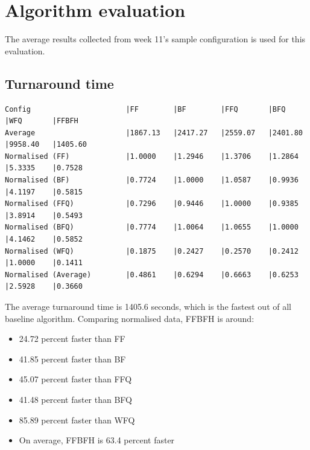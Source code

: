 \documentclass[a4paper]{article} %
\begin{document}
\section{Algorithm evaluation}
\label{sec:section4}
The average results collected from week 11's sample configuration is used for this evaluation.
\subsection{Turnaround time}
\begin{lstlisting}
Config                      |FF        |BF        |FFQ       |BFQ       |WFQ       |FFBFH
Average                     |1867.13   |2417.27   |2559.07   |2401.80   |9958.40   |1405.60   
Normalised (FF)             |1.0000    |1.2946    |1.3706    |1.2864    |5.3335    |0.7528    
Normalised (BF)             |0.7724    |1.0000    |1.0587    |0.9936    |4.1197    |0.5815    
Normalised (FFQ)            |0.7296    |0.9446    |1.0000    |0.9385    |3.8914    |0.5493    
Normalised (BFQ)            |0.7774    |1.0064    |1.0655    |1.0000    |4.1462    |0.5852    
Normalised (WFQ)            |0.1875    |0.2427    |0.2570    |0.2412    |1.0000    |0.1411    
Normalised (Average)        |0.4861    |0.6294    |0.6663    |0.6253    |2.5928    |0.3660
\end{lstlisting}
The average turnaround time is 1405.6 seconds, which is the fastest out of all baseline algorithm. Comparing normalised data, FFBFH is around:
\begin{itemize}
    \item 24.72 percent faster than FF
    \item 41.85 percent faster than BF
    \item 45.07 percent faster than FFQ
    \item 41.48 percent faster than BFQ
    \item 85.89 percent faster than WFQ
    \item On average, FFBFH is 63.4 percent faster
\end{itemize}
\end{document}
